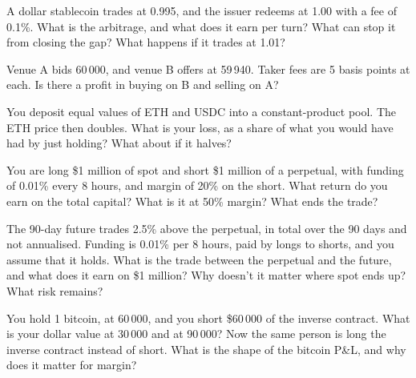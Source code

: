 \begin{question}\label{iq:iv2:crypto-for-traders-and-researchers:6}
A dollar stablecoin trades at 0.995, and the issuer redeems at 1.00 with a fee of 0.1\%. What is the arbitrage, and what does it earn per turn? What can stop it from closing the gap? What happens if it trades at 1.01?
\end{question}

\begin{question}\label{iq:iv2:crypto-for-traders-and-researchers:7}
Venue A bids 60\,000, and venue B offers at 59\,940. Taker fees are 5 basis points at each. Is there a profit in buying on B and selling on A?
\end{question}

\begin{question}\label{iq:iv2:crypto-for-traders-and-researchers:8}
You deposit equal values of ETH and USDC into a constant-product pool. The ETH price then doubles. What is your loss, as a share of what you would have had by just holding? What about if it halves?
\end{question}

\begin{question}\label{iq:iv2:crypto-for-traders-and-researchers:9}
You are long \$1 million of spot and short \$1 million of a perpetual, with funding of 0.01\% every 8 hours, and margin of 20\% on the short. What return do you earn on the total capital? What is it at 50\% margin? What ends the trade?
\end{question}

\begin{question}\label{iq:iv2:crypto-for-traders-and-researchers:10}
The 90-day future trades 2.5\% above the perpetual, in total over the 90 days and not annualised. Funding is 0.01\% per 8 hours, paid by longs to shorts, and you assume that it holds. What is the trade between the perpetual and the future, and what does it earn on \$1 million? Why doesn't it matter where spot ends up? What risk remains?
\end{question}

\begin{question}\label{iq:iv2:crypto-for-traders-and-researchers:11}
You hold 1 bitcoin, at 60\,000, and you short \$60\,000 of the inverse contract. What is your dollar value at 30\,000 and at 90\,000? Now the same person is long the inverse contract instead of short. What is the shape of the bitcoin P\&L, and why does it matter for margin?
\end{question}

